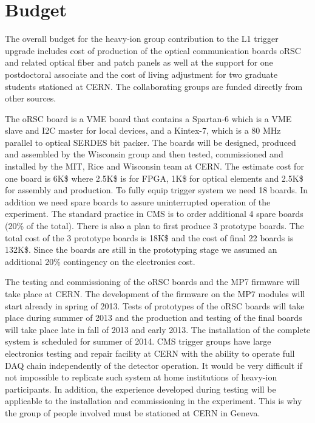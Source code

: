 \section{Budget}
\label{sec:funding}

The overall budget for the heavy-ion group contribution to the L1 trigger upgrade includes cost of production of the optical communication boards oRSC and related optical fiber and patch panels as well at the support for one postdoctoral associate and the cost of living adjustment for two graduate students stationed at CERN. The collaborating groups are funded directly from other sources.

The oRSC board is a VME board that contains a Spartan-6 which is a VME slave and I2C master for local devices, and a Kintex-7, which is a 80 MHz parallel to optical SERDES bit packer. The boards will be designed, produced and assembled by the Wisconsin group and then tested, commissioned and installed by the MIT, Rice and Wisconsin team at CERN. The estimate cost for one board is 6K\$ where 2.5K\$ is for FPGA, 1K\$ for optical elements and 2.5K\$ for assembly and production. To fully equip trigger system we need 18 boards. In addition we need spare boards to assure uninterrupted operation of the experiment. The standard practice in CMS is to order additional 4 spare boards (20\% of the total). There is also a plan to first produce 3 prototype boards. The total cost of the 3 prototype boards is 18K\$ and the cost of final 22 boards is 132K\$. Since the boards are still in the prototyping stage we assumed an additional 20\% contingency on the electronics cost.

The testing and commissioning of the oRSC boards and the MP7 firmware will take place at CERN. The development of the firmware on the MP7 modules will start already in spring of 2013. Tests of prototypes of the oRSC boards will take place during summer of 2013 and the production and testing of the final boards will take place late in fall of 2013 and early 2013. The installation of the complete system is scheduled for summer of 2014. CMS trigger groups have large electronics testing and repair facility at CERN with the ability to operate full DAQ chain independently of the detector operation. It would be very difficult if not impossible to replicate such system at home institutions of heavy-ion participants. In addition, the experience developed during testing will be applicable to the installation and commissioning in the experiment. This is why the group of people involved must be stationed at CERN in Geneva.

